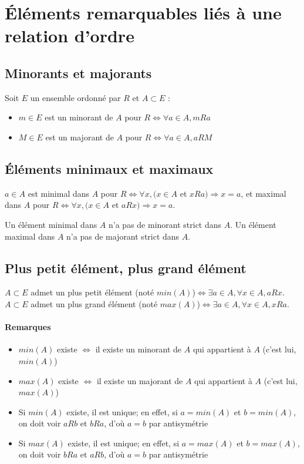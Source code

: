 \documentclass[11pt]{article}
\begin{document}
    \section{Éléments remarquables liés à une relation d'ordre}
        \subsection{Minorants et majorants}
        Soit $E$ un ensemble ordonné par $R$ et $A\subset E$ :
            \begin{itemize}
                \item $m\in E$ est un minorant de $A$ pour $R\Leftrightarrow\forall a\in A,mRa$
                \item $M\in E$ est un majorant de $A$ pour $R\Leftrightarrow\forall a\in A, aRM$
            \end{itemize}

        \subsection{Éléments minimaux et maximaux}
            $a\in A$ est minimal dans $A$ pour $R\Leftrightarrow\forall x,(x\in A$ et $xRa)\Rightarrow x=a$, et maximal dans $A$ pour $R\Leftrightarrow\forall x,(x\in A$ et $aRx)\Rightarrow x=a$.

            Un élément minimal dans $A$ n'a pas de minorant strict dans $A$. Un élément maximal dans $A$ n'a pas de majorant strict dans $A$.

        \subsection{Plus petit élément, plus grand élément}
            $A\subset E$ admet un plus petit élément (noté $min(A)$)$\Leftrightarrow\exists a\in A,\forall x\in A, aRx$. $A\subset E$ admet un plus grand élément (noté $max(A)$)$\Leftrightarrow\exists a\in A,\forall x\in A, xRa$.

            \paragraph{Remarques}
                \begin{itemize}
                    \item $min(A)$ existe $\Leftrightarrow$ il existe un minorant de $A$ qui appartient à $A$ (c'est lui, $min(A)$)
                    \item $max(A)$ existe $\Leftrightarrow$ il existe un majorant de $A$ qui appartient à $A$ (c'est lui, $max(A)$)
                    \item Si $min(A)$ existe, il est unique; en effet, si $a=min(A)$ et $b=min(A)$, on doit voir $aRb$ et $bRa$, d'où $a=b$ par antisymétrie
                    \item Si $max(A)$ existe, il est unique; en effet, si $a=max(A)$ et $b=max(A)$, on doit voir $bRa$ et $aRb$, d'où $a=b$ par antisymétrie
                \end{itemize}
\end{document}
